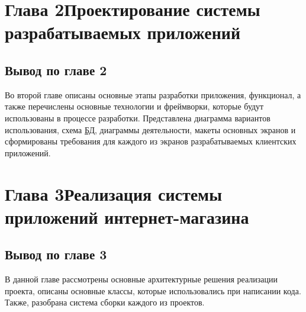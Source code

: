 \documentclass[14pt,a4paper]{scrartcl}
\begin{document}
    \pagestyle{empty}

    

    

    \clearpage
    \tableofcontents\thispagestyle{empty}

    
    \pagestyle{plain}
    
    
    
    \section[Глава 2 Проектирование системы разрабатываемых приложений]{Глава 2\break Проектирование системы разрабатываемых приложений}
    \label{sec:charpter-2-designing}

    
    
    
    
    
    
    
    
    

    \subsection{Вывод по главе 2}\label{subsec:2-conclusion}\indent

    Во второй главе описаны основные этапы разработки приложения, функционал, 
    а также перечислены основные технологии и фреймворки, которые будут использованы в процессе разработки. Представлена диаграмма вариантов использования, 
    схема \hyperlink{gloss:db}{БД}, диаграммы деятельности, макеты основных экранов и сформированы требования для каждого из экранов разрабатываемых клиентских приложений.

    \section[Глава 3 Реализация системы приложений интернет-магазина]{Глава 3\break Реализация системы приложений интернет-магазина}
    \label{sec:charpter-3-inplementation}

    
    
    

    \subsection{Вывод по главе 3}\label{subsec:3-conclusion}\indent

    В данной главе рассмотрены основные архитектурные решения реализации проекта, описаны основные классы, которые использовались при написании кода.
    Также, разобрана система сборки каждого из проектов.

    

    

    
    
\end{document}
